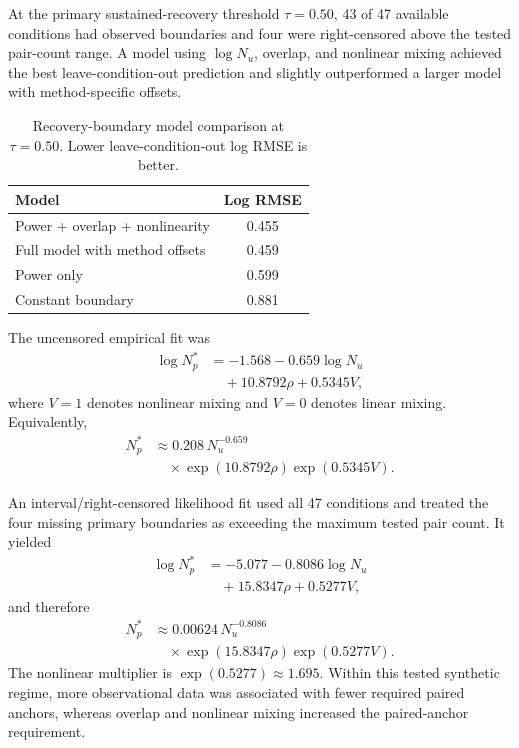 At the primary sustained-recovery threshold $\tau=0.50$, 43 of 47 available conditions had observed boundaries and four were right-censored above the tested pair-count range. A model using $\log N_u$, overlap, and nonlinear mixing achieved the best leave-condition-out prediction and slightly outperformed a larger model with method-specific offsets.

\begin{table}[t]
\centering
\caption{Recovery-boundary model comparison at $\tau=0.50$. Lower leave-condition-out log RMSE is better.}
\small
\begin{tabular}{lc}
\toprule
Model & Log RMSE\\
\midrule
Power + overlap + nonlinearity & 0.455\\
Full model with method offsets & 0.459\\
Power only & 0.599\\
Constant boundary & 0.881\\
\bottomrule
\end{tabular}
\end{table}

The uncensored empirical fit was
\begin{align}
  \log N_p^{\ast}
  &=-1.568-0.659\log N_u \\
  &\quad+10.8792\rho+0.5345V,
\end{align}
where $V=1$ denotes nonlinear mixing and $V=0$ denotes linear mixing. Equivalently,
\begin{align}
  N_p^{\ast}
  &\approx0.208\,N_u^{-0.659} \\
  &\quad\times\exp(10.8792\rho)\exp(0.5345V).
\end{align}

An interval/right-censored likelihood fit used all 47 conditions and treated the four missing primary boundaries as exceeding the maximum tested pair count. It yielded
\begin{align}
  \log N_p^{\ast}
  &=-5.077-0.8086\log N_u \\
  &\quad+15.8347\rho+0.5277V,
\end{align}
and therefore
\begin{align}
  N_p^{\ast}
  &\approx0.00624\,N_u^{-0.8086} \\
  &\quad\times\exp(15.8347\rho)\exp(0.5277V).
\end{align}
The nonlinear multiplier is $\exp(0.5277)\approx1.695$. Within this tested synthetic regime, more observational data was associated with fewer required paired anchors, whereas overlap and nonlinear mixing increased the paired-anchor requirement.

